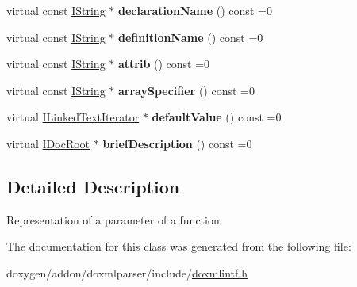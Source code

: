 \begin{DoxyCompactItemize}
virtual const \mbox{\hyperlink{class_i_string}{I\+String}} $\ast$ {\bfseries declaration\+Name} () const =0
\item 
\mbox{\label{class_i_param_af616b2e255f9216395d730e7f4d811b8}} 
virtual const \mbox{\hyperlink{class_i_string}{I\+String}} $\ast$ {\bfseries definition\+Name} () const =0
\item 
\mbox{\label{class_i_param_af622c7971fe6889852cc33abba09aa9e}} 
virtual const \mbox{\hyperlink{class_i_string}{I\+String}} $\ast$ {\bfseries attrib} () const =0
\item 
\mbox{\label{class_i_param_a5dfe6801a6b95b7ca48f840cd3d004e5}} 
virtual const \mbox{\hyperlink{class_i_string}{I\+String}} $\ast$ {\bfseries array\+Specifier} () const =0
\item 
\mbox{\label{class_i_param_aa9f4f8b678c0a3dbe2e716ff08ea1e26}} 
virtual \mbox{\hyperlink{class_i_linked_text_iterator}{I\+Linked\+Text\+Iterator}} $\ast$ {\bfseries default\+Value} () const =0
\item 
\mbox{\label{class_i_param_a180c3c07fa5bc453b8f9497a20fef898}} 
virtual \mbox{\hyperlink{class_i_doc_root}{I\+Doc\+Root}} $\ast$ {\bfseries brief\+Description} () const =0
\end{DoxyCompactItemize}


\subsection{Detailed Description}
Representation of a parameter of a function. 

The documentation for this class was generated from the following file\+:\begin{DoxyCompactItemize}
\item 
doxygen/addon/doxmlparser/include/\mbox{\hyperlink{include_2doxmlintf_8h}{doxmlintf.\+h}}\end{DoxyCompactItemize}
